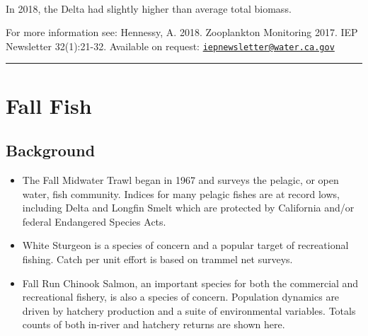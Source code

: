 \documentclass[
]{book}
\providecommand{\tightlist}{%
  \setlength{\itemsep}{0pt}\setlength{\parskip}{0pt}}
\begin{document}
\begin{panel-grid}
\begin{columns-nocenter}
\begin{column40}

~

\end{column40}

\begin{column800}

In 2018, the Delta had slightly higher than average total biomass.

\end{column800}

\end{columns-nocenter}

\end{panel-grid}

\begin{disclaimer}
For more information see: Hennessy, A. 2018. Zooplankton Monitoring
2017. IEP Newsletter 32(1):21-32. Available on request:
\href{mailto:iepnewsletter@water.ca.gov}{\nolinkurl{iepnewsletter@water.ca.gov}}
\end{disclaimer}

\begin{center}\rule{0.5\linewidth}{0.5pt}\end{center}

\hypertarget{fall-fish}{%
\section{Fall Fish}\label{fall-fish}}

\hypertarget{background-4}{%
\subsection{Background}\label{background-4}}

\begin{itemize}
\tightlist
\item
  The Fall Midwater Trawl began in 1967 and surveys the pelagic, or open water, fish community. Indices for many pelagic fishes are at record lows, including Delta and Longfin Smelt which are protected by California and/or federal Endangered Species Acts.
\item
  White Sturgeon is a species of concern and a popular target of recreational fishing. Catch per unit
  effort is based on trammel net surveys.
\item
  Fall Run Chinook Salmon, an important species for both the commercial and recreational fishery, is also a species of concern. Population dynamics are driven by hatchery production and a suite of environmental variables. Totals counts of both in-river and hatchery returns are shown here.
\end{itemize}
\end{document}
